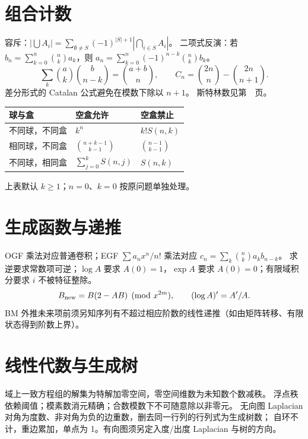 \section{组合计数}\label{knowledge-counting-identities}
容斥：$|\bigcup A_i|=\sum_{\emptyset\ne S}(-1)^{|S|+1}|\bigcap_{i\in S}A_i|$。
二项式反演：若 $b_n=\sum_{k=0}^{n}\binom nk a_k$，则
$a_n=\sum_{k=0}^{n}(-1)^{n-k}\binom nk b_k$。
\[
\sum_k\binom ak\binom b{n-k}=\binom{a+b}n,\qquad
C_n=\binom{2n}n-\binom{2n}{n+1}.
\]
差分形式的 Catalan 公式避免在模数下除以 $n+1$。
斯特林数见第~\pageref{knowledge-stirling-definitions}~页。
\begin{center}
\begin{tabular}{lll}
\toprule
球与盒 & 空盒允许 & 空盒禁止\\\midrule
不同球，不同盒 & $k^n$ & $k!S(n,k)$\\
相同球，不同盒 & $\binom{n+k-1}{k-1}$ & $\binom{n-1}{k-1}$\\
不同球，相同盒 & $\sum_{j=0}^{k}S(n,j)$ & $S(n,k)$\\
\bottomrule
\end{tabular}
\end{center}
上表默认 $k\ge1$；$n=0$、$k=0$ 按原问题单独处理。

\section{生成函数与递推}\label{knowledge-generating-recurrence}
OGF 乘法对应普通卷积；EGF $\sum a_nx^n/n!$ 乘法对应 $c_n=\sum_k\binom nk a_kb_{n-k}$。
求逆要求常数项可逆；$\log A$ 要求 $A(0)=1$，$\exp A$ 要求 $A(0)=0$；有限域积分要求 $i$ 不被特征整除。
\[
B_{\rm new}=B(2-AB)\pmod{x^{2m}},\qquad
(\log A)'=A'/A.
\]
BM 外推未来项前须另知序列有不超过相应阶数的线性递推（如由矩阵转移、有限状态得到阶数上界）。

\section{线性代数与生成树}\label{knowledge-matrix-span}
域上一致方程组的解集为特解加零空间，零空间维数为未知数个数减秩。
浮点秩依赖阈值；模素数消元精确；合数模数下不可随意除以非零元。
无向图 Laplacian 对角为度数、非对角为负的边重数，删去同一行列的行列式为生成树数；
自环不计，重边累加，单点为 1。有向图须另定入度/出度 Laplacian 与树的方向。

